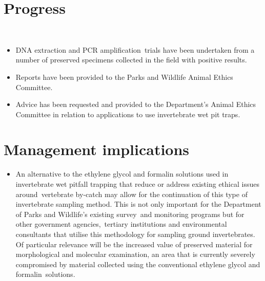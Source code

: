 \documentclass[version=last,
    paper=a4, %
    10pt, %
    usenames,
    dvipsnames,
    oneside, %
    headings=openany, %
    DIV=15 %
]{scrbook}
\begin{document}
\section*{Progress}
~

\begin{itemize}
\itemsep1pt\parskip0pt
\item
  DNA extraction and PCR amplification~trials have been undertaken from
  a number of preserved specimens collected in the field with positive
  results.
\item
  Reports have been provided to the Parks and Wildlife Animal Ethics
  Committee.
\item
  Advice has been requested and provided to the Department's Animal
  Ethics Committee in relation to applications to use invertebrate wet
  pit traps.
\end{itemize}



\section*{Management implications}
\begin{itemize}
\item
  An alternative to the ethylene glycol and formalin solutions used in
  invertebrate wet pitfall trapping that reduce or address existing
  ethical issues around~vertebrate by-catch may allow for the
  continuation of this type of invertebrate sampling method. This is not
  only important for the Department of Parks and Wildlife's existing
  survey~and monitoring programs but for other government
  agencies,~tertiary institutions and environmental consultants that
  utilise this methodology for sampling ground invertebrates. Of
  particular relevance will be the increased value of preserved material
  for morphological and molecular examination, an area that is currently
  severely compromised by material collected using the conventional
  ethylene glycol and formalin~solutions.~~~~
\end{itemize}
\end{document}

